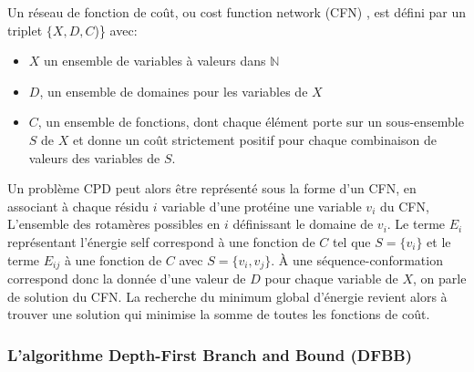 Un réseau de fonction de coût, ou \og cost function network  \fg (CFN) , est défini par un triplet $\{X,D,C$)\} avec:

\begin{itemize}
\item $X$ un ensemble de variables à valeurs dans $\mathbb{N}$
\item $D$, un ensemble de domaines pour les variables de $X$
 \item $C$, un ensemble de fonctions, dont chaque élément porte sur un sous-ensemble $S$ de $X$ et donne un coût strictement positif pour chaque combinaison de valeurs des variables de $S$.

\end{itemize}  


Un problème CPD peut alors être représenté sous la forme d'un CFN, en associant à chaque résidu $i$ variable d'une protéine une variable $v_i$ du CFN, L'ensemble des rotamères possibles en $i$ définissant le domaine de $v_i$. Le terme $E_i$ représentant l'énergie \og self \fg correspond à une fonction de $C$ tel que $S=\{v_i\}$ et le terme $E_{ij}$ à une fonction de $C$ avec $S=\{v_i,v_j\}$. À une séquence-conformation correspond donc la donnée d'une valeur de $D$ pour chaque variable de $X$, on parle de solution du CFN. La recherche du minimum global d'énergie revient alors à trouver une solution qui minimise la somme de toutes les fonctions de coût.

\subsubsection{L'algorithme \og Depth-First Branch and Bound \fg (DFBB)}


